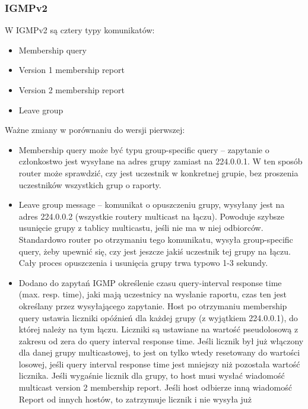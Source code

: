 \documentclass[../main.tex]{subfiles}
\begin{document}
    \subsubsection{IGMPv2}

    W IGMPv2 są cztery typy komunikatów:
    \begin{itemize}
        \item Membership query
        \item Version 1 membership report
        \item Version 2 membership report
        \item Leave group
    \end{itemize}


    Ważne zmiany w porównaniu do wersji pierwszej:
    \begin{itemize}
        \item Membership query może być typu group-specific query – zapytanie o członkostwo
        jest wysyłane na adres grupy zamiast na 224.0.0.1. W ten sposób router może
        sprawdzić, czy jest uczestnik w konkretnej grupie, bez proszenia uczestników
        wszystkich grup o raporty.
        \item Leave group message – komunikat o opuszczeniu grupy, wysyłany jest na adres
        224.0.0.2 (wszystkie routery multicast na łączu). Powoduje szybsze usunięcie grupy z
        tablicy multicastu, jeśli nie ma w niej odbiorców. Standardowo router po otrzymaniu
        tego komunikatu, wysyła group-specific query, żeby upewnić się, czy jest jeszcze jakiś
        uczestnik tej grupy na łączu. Cały proces opuszczenia i usunięcia grupy trwa typowo
        1-3 sekundy.
        \item Dodano do zapytań IGMP określenie czasu query-interval response time
        (max. resp. time), jaki mają uczestnicy na wysłanie raportu, czas ten jest określany przez
        wysyłającego zapytanie. Host po otrzymaniu membership query ustawia liczniki
        opóźnień dla każdej grupy (z wyjątkiem 224.0.0.1), do której należy na tym łączu.
        Liczniki są ustawiane na wartość pseudolosową z zakresu od zera do query interval
        response time. Jeśli licznik był już włączony dla danej grupy multicastowej, to jest on
        tylko wtedy resetowany do wartości losowej, jeśli query interval response time jest
        mniejszy niż pozostała wartość licznika. Jeśli wygaśnie licznik dla grupy, to host musi
        wysłać wiadomość multicast version 2 membership report. Jeśli host odbierze inną
        wiadomość Report od innych hostów, to zatrzymuje licznik i nie wysyła już

\end{itemize}
\end{document}
